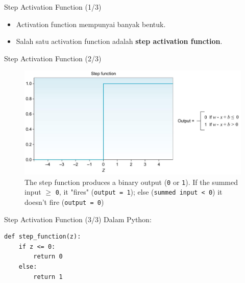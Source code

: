 \documentclass{beamer}
\begin{document}
\begin{frame}{Step Activation Function (1/3)}
	\begin{itemize}
		\item<2-> Activation function mempunyai banyak bentuk. 
		\item<3-> Salah satu activation function adalah \textbf{step activation function}.
	\end{itemize}
\end{frame}

\begin{frame}{Step Activation Function (2/3)}
	\begin{figure}[ht]
	\centering
	\includegraphics[scale=0.2]{images/step-activation-function}
	\caption{The step function produces a binary output (\texttt{0} or \texttt{1}). If the summed input $\geq$ \texttt{0}, it "fires" (\texttt{output = 1}); else (\texttt{summed input < 0}) it doesn't fire (\texttt{output = 0})}
\end{figure}			
\end{frame}

\begin{frame}[fragile]{Step Activation Function (3/3)}
	Dalam Python:
	\begin{verbatim}
def step_function(z):
    if z <= 0:
        return 0
    else:
        return 1
	\end{verbatim}
\end{frame}
\end{document}
